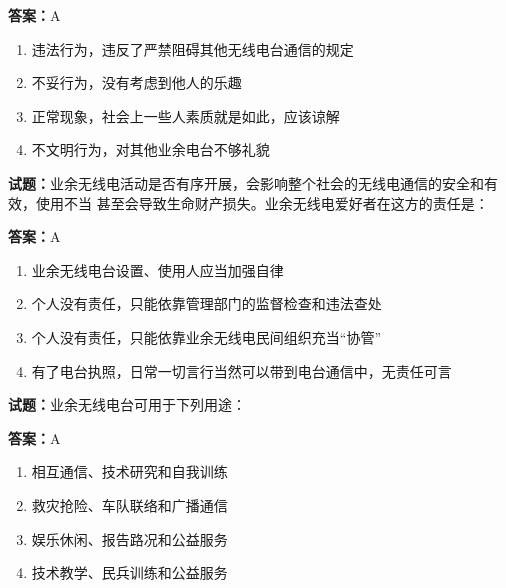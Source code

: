 \documentclass{ctexbook}
\begin{document}
\textbf{答案：}A 

\begin{enumerate}[leftmargin=3em]
  \item 违法行为，违反了严禁阻碍其他无线电台通信的规定 

  \item 不妥行为，没有考虑到他人的乐趣 

  \item 正常现象，社会上一些人素质就是如此，应该谅解 

  \item 不文明行为，对其他业余电台不够礼貌 

\end{enumerate}





\vspace{1em}

\textbf{试题：}业余无线电活动是否有序开展，会影响整个社会的无线电通信的安全和有效，使用不当
甚至会导致生命财产损失。业余无线电爱好者在这方的责任是： 

\textbf{答案：}A 

\begin{enumerate}[leftmargin=3em]
  \item 业余无线电台设置、使用人应当加强自律 

  \item 个人没有责任，只能依靠管理部门的监督检查和违法查处 

  \item 个人没有责任，只能依靠业余无线电民间组织充当“协管” 

  \item 有了电台执照，日常一切言行当然可以带到电台通信中，无责任可言 

\end{enumerate}





\vspace{1em}

\textbf{试题：}业余无线电台可用于下列用途： 

\textbf{答案：}A 

\begin{enumerate}[leftmargin=3em]
  \item 相互通信、技术研究和自我训练 

  \item 救灾抢险、车队联络和广播通信 

  \item 娱乐休闲、报告路况和公益服务 

  \item 技术教学、民兵训练和公益服务 

\end{enumerate}
\end{document}
